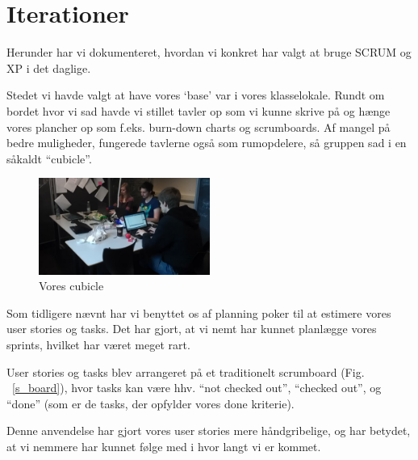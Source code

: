 \documentclass[12pt, a4paper]{report}
\begin{document}
\section{Iterationer}

Herunder har vi dokumenteret, hvordan vi konkret har valgt at bruge SCRUM og XP i det daglige.

Stedet vi havde valgt at have vores ‘base’ var i vores klasselokale. Rundt om bordet hvor vi sad havde vi stillet tavler op som vi kunne skrive på og hænge vores plancher op som f.eks. burn-down charts og scrumboards. Af mangel på bedre muligheder, fungerede tavlerne også som rumopdelere, så gruppen sad i en såkaldt “cubicle”.

\begin{figure}[hp]
\centering
\includegraphics[width=0.5\textwidth]{ziriuzarbejde}
\caption{Vores cubicle}
\label{cubicle}
\end{figure}

Som tidligere nævnt har vi benyttet os af planning poker til at estimere vores user stories og tasks. Det har gjort, at vi nemt har kunnet planlægge vores sprints, hvilket har været meget rart.

User stories og tasks blev arrangeret på et traditionelt scrumboard (Fig. ~\ref{s_board}), hvor tasks kan være hhv. “not checked out”, “checked out”, og “done” (som er de tasks, der opfylder vores done kriterie).

Denne anvendelse har gjort vores user stories mere håndgribelige, og har betydet, at vi nemmere har kunnet følge med i hvor langt vi er kommet.
\end{document}
